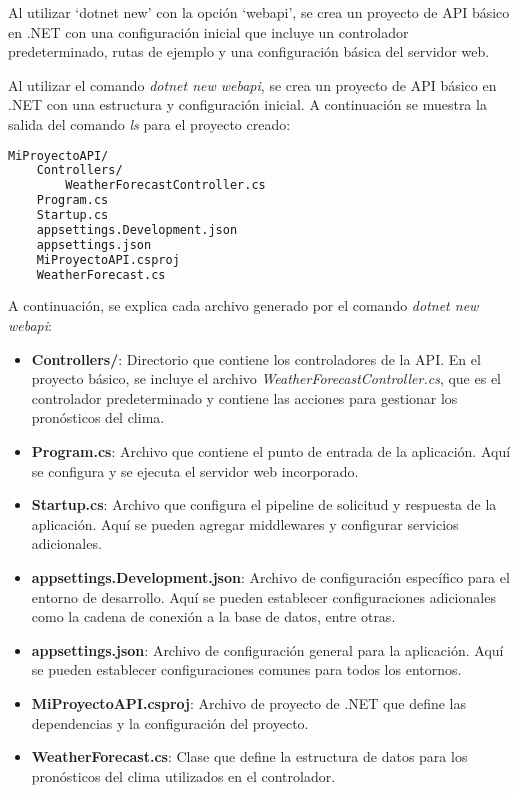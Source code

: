 \documentclass[executivepaper]{article}
\begin{document}
Al utilizar \enquote*{dotnet new} con la opción \enquote*{webapi}, se crea un proyecto de API básico en .NET con una configuración inicial que incluye un controlador predeterminado, rutas de ejemplo y una configuración básica del servidor web.

Al utilizar el comando \emph{dotnet new webapi}, se crea un proyecto de API básico en .NET con una estructura y configuración inicial. A continuación se muestra la salida del comando \emph{ls} para el proyecto creado:

\begin{lstlisting}[language=bash]
MiProyectoAPI/
    Controllers/
        WeatherForecastController.cs
    Program.cs
    Startup.cs
    appsettings.Development.json
    appsettings.json
    MiProyectoAPI.csproj
    WeatherForecast.cs
\end{lstlisting}

A continuación, se explica cada archivo generado por el comando \emph{dotnet new webapi}:

\begin{itemize}
  \item \textbf{Controllers/}: Directorio que contiene los controladores de la API. En el proyecto básico, se incluye el archivo \emph{WeatherForecastController.cs}, que es el controlador predeterminado y contiene las acciones para gestionar los pronósticos del clima.

  \item \textbf{Program.cs}: Archivo que contiene el punto de entrada de la aplicación. Aquí se configura y se ejecuta el servidor web incorporado.

  \item \textbf{Startup.cs}: Archivo que configura el pipeline de solicitud y respuesta de la aplicación. Aquí se pueden agregar middlewares y configurar servicios adicionales.

  \item \textbf{appsettings.Development.json}: Archivo de configuración específico para el entorno de desarrollo. Aquí se pueden establecer configuraciones adicionales como la cadena de conexión a la base de datos, entre otras.

  \item \textbf{appsettings.json}: Archivo de configuración general para la aplicación. Aquí se pueden establecer configuraciones comunes para todos los entornos.

  \item \textbf{MiProyectoAPI.csproj}: Archivo de proyecto de .NET que define las dependencias y la configuración del proyecto.

  \item \textbf{WeatherForecast.cs}: Clase que define la estructura de datos para los pronósticos del clima utilizados en el controlador.

\end{itemize}
\end{document}
